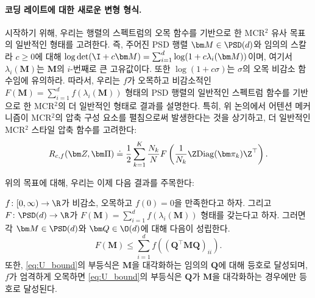 \documentclass[../../book-main_ko.tex]{subfiles}
\begin{document}
\paragraph{코딩 레이트에 대한 새로운 변형 형식.} 시작하기 위해, 우리는 행렬의 스펙트럼의 오목 함수를 기반으로 한 MCR$^2$ 유사 목표의 일반적인 형태를 고려한다. 즉, 주어진 PSD 행렬 $\bm M \in \PSD(d)$와 임의의 스칼라 $c \geq 0$에 대해 $\log \det (\I + c \bm M) = \sum_{i=1}^{d} \log( 1 + c \lambda_i(\bm M))$이며, 여기서 $\lambda_i (\bm M)$는 $\bm M$의 $i$-번째로 큰 고유값이다. 또한 $\log(1 + c \sigma)$는 $\sigma$의 오목 비감소 함수임에 유의하라. 따라서, 우리는 $f$가 오목하고 비감소적인 $F(\bm M) = \sum_{i=1}^{d} f(\lambda_i(\bm M))$ 형태의 PSD 행렬의 일반적인 스펙트럼 함수를 기반으로 한 MCR$^2$의 더 일반적인 형태로 결과를 설명한다. 특히, 위 논의에서 어텐션 메커니즘이 MCR$^2$의 압축 구성 요소를 펼침으로써 발생한다는 것을 상기하고, 더 일반적인 MCR$^2$ 스타일 압축 함수를 고려한다:
\vspace{-2mm}
\begin{equation}
    R_{c,f}(\bm Z, \bm \Pi) \doteq \frac{1}{2}\sum_{k=1}^K \frac{N_k}{N} F\left( \frac{1}{N_k}\Z \mathrm{Diag}(\bm \pi_k) \Z^{\top} \right).
    \label{eq:mcr_c_gen}
\end{equation}



위의 목표에 대해, 우리는 이제 다음 결과를 주목한다:
\begin{theorem}
\label{thm:var_concave}
    \(f \colon [0, \infty) \to \R\)가 비감소, 오목하고 \(f(0) = 0\)을 만족한다고 하자. 그리고 \(F \colon \PSD(d) \to \R\)가 \(F(\bm M) = \sum_{i = 1}^{d}f(\lambda_{i}(\bm M))\) 형태를 갖는다고 하자. 그러면 각 \(\bm M \in \PSD(d)\)와 \(\bm Q \in \O(d)\)에 대해 다음이 성립한다.
    \begin{equation}
        \label{eq:U_bound}
        F(\bm M) \leq  \sum_{i=1}^{d} f\left( (\bm Q^{\top} \bm M \bm Q)_{ii} \right).
    \end{equation}
    또한, \eqref{eq:U_bound}의 부등식은 $\bm M$을 대각화하는 임의의 $\bm Q$에 대해 등호로 달성되며, $f$가 엄격하게 오목하면 \eqref{eq:U_bound}의 부등식은 $\bm Q$가 $\bm M$을 대각화하는 경우에만 등호로 달성된다.
\end{theorem}
\end{document}

